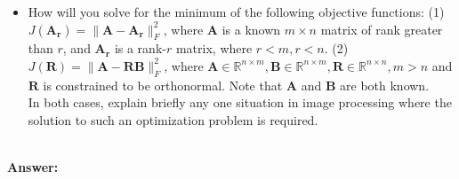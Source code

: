 \documentclass[12pt]{article}
\author{\textbf{Question 3}}
\date{}
\begin{document}
\maketitle

\begin{itemize}
    \item How will you solve for the minimum of the following objective functions: (1) $J(\boldsymbol{A_r}) = \|\boldsymbol{A}-\boldsymbol{A_r}\|^2_F$, where $\boldsymbol{A}$ is a known $m \times n$ matrix of rank greater than $r$, and $\boldsymbol{A_r}$ is a rank-$r$ matrix, where $r < m, r < n$. (2) $J(\boldsymbol{R}) = \|\boldsymbol{A}-\boldsymbol{R} \boldsymbol{B}\|^2_F$, where $\boldsymbol{A} \in \mathbb{R}^{n \times m}, \boldsymbol{B} \in \mathbb{R}^{n \times m}, \boldsymbol{R} \in \mathbb{R}^{n \times n}, m > n$ and $\boldsymbol{R}$ is constrained to be orthonormal. Note that $\boldsymbol{A}$ and $\boldsymbol{B}$ are both known. \\
In both cases, explain briefly any one situation in image processing where the solution to such an optimization problem is required.
\end{itemize}
\vspace*{0.5cm}\\
\textbf{Answer:} \\
\end{document}
